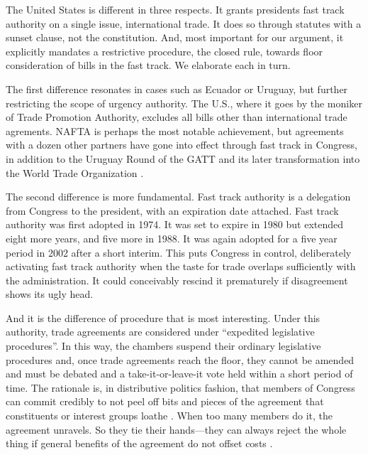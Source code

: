 \documentclass[letter,12pt]{article}
\begin{document}
The United States is different in three respects. It grants presidents fast track authority on a single issue, international trade. It does so through statutes with a sunset clause, not the constitution. And, most important for our argument, it explicitly mandates a restrictive procedure, the closed rule, towards floor consideration of bills in the fast track. We elaborate each in turn.

The first difference resonates in cases such as Ecuador or Uruguay, but further restricting the scope of urgency authority. The U.S., where it goes by the moniker of Trade Promotion Authority, excludes all bills other than international trade agrements. NAFTA is perhaps the most notable achievement, but agreements with a dozen other partners have gone into effect through fast track in Congress, in addition to the Uruguay Round of the GATT and its later transformation into the World Trade Organization \citep{crs-2015-tpa}. 

The second difference is more fundamental. Fast track authority is a delegation from Congress to the president, with an expiration date attached. Fast track authority was first adopted in 1974. It was set to expire in 1980 but extended eight more years, and five more in 1988. It was again adopted for a five year period in 2002 after a short interim. This puts Congress in control, deliberately activating fast track authority when the taste for trade overlaps sufficiently with the administration. It could conceivably rescind it prematurely if disagreement shows its ugly head. 

And it is the difference of procedure that is most interesting. Under this authority, trade agreements are considered under ``expedited legislative procedures''. In this way, the chambers suspend their ordinary legislative procedures and, once trade agreements reach the floor, they cannot be amended and must be debated and a take-it-or-leave-it vote held within a short period of time. The rationale is, in distributive politics fashion, that members of Congress can commit credibly to not peel off bits and pieces of the agreement that constituents or interest groups loathe \citep{mcnollgast.1987}. When too many members do it, the agreement unravels. So they tie their hands---they can always reject the whole thing if general benefits of the agreement do not offset costs \citep{destler-1992,destler-1991,margolis-1986,haggard-1988,goldstein-1988,lohmann-ohalloran.1994}.
\end{document}
